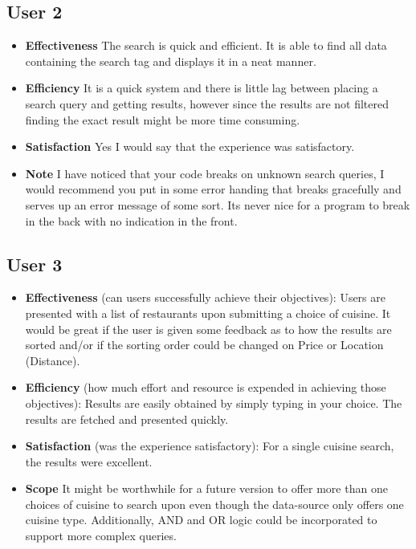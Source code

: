 \subsection{User 2}

\begin{itemize}
  
\item \textbf{Effectiveness} The search is quick and efficient. It is able to find all data containing the search tag and displays it in a neat manner.

\item \textbf{Efficiency} It is a quick system and there is little lag between placing a search query and getting results, however since the results are not filtered finding the exact result might be more time consuming.

\item \textbf{Satisfaction} Yes I would say that the experience was satisfactory. 
\item \textbf{Note} I have noticed that your code breaks on unknown search queries, I would recommend you put in some error handing that breaks gracefully and serves up an error message of some sort. Its never nice for a program to break in the back with no indication in the front.

\end{itemize}

\subsection{User 3}

\begin{itemize}
\item \textbf{Effectiveness} (can users successfully achieve their objectives):
        Users are presented with a list of restaurants upon submitting a choice of cuisine. It would be great if the user is given some feedback as to how the results are sorted and/or if the sorting order could be changed on Price or Location (Distance).

\item \textbf{Efficiency} (how much effort and resource is expended in achieving those objectives):
        Results are easily obtained by simply typing in your choice. The results are fetched and presented quickly.

\item \textbf{Satisfaction} (was the experience satisfactory):
        For a single cuisine search, the results were excellent.

\item \textbf{Scope} It might be worthwhile for a future version to offer more than one choices of cuisine to search upon even though the data-source only offers one cuisine type. Additionally, AND and OR logic could be incorporated to support more complex queries.

\end{itemize}

